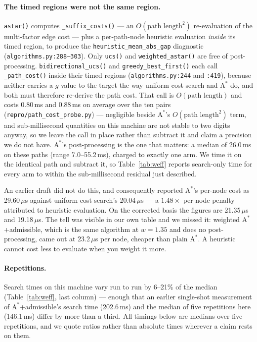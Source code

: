 \documentclass[11pt]{article}
\begin{document}
\paragraph{The timed regions were not the same region.} \texttt{astar()} computes
\texttt{\_suffix\_costs()} --- an $O(\text{path length}^2)$ re-evaluation of the multi-factor edge
cost --- plus a per-path-node heuristic evaluation \emph{inside} its timed region, to produce the
\texttt{heuristic\_mean\_abs\_gap} diagnostic (\texttt{algorithms.py:288--303}).
Only \texttt{ucs()} and \texttt{weighted\_astar()} are free of post-processing.
\texttt{bidirectional\_ucs()} and \texttt{greedy\_best\_first()} each call
\texttt{\_path\_cost()} inside their timed regions (\texttt{algorithms.py:244} and
\texttt{:419}), because neither carries a $g$-value to the target the way uniform-cost search and
$\mathrm{A}^*$ do, and both must therefore re-derive the path cost. That call is
$O(\text{path length})$ and costs 0.80\,ms and 0.88\,ms on average over the ten pairs
(\texttt{repro/\allowbreak path\_cost\_probe.py}) --- negligible beside $\mathrm{A}^*$'s
$O(\text{path length}^2)$ term, and sub-millisecond quantities on this machine are not stable to
two digits anyway, so we leave the call in place rather than subtract it and claim a precision we
do not have. $\mathrm{A}^*$'s post-processing is the one that matters: a median of
26.0\,ms on these paths (range 7.0--55.2\,ms), charged to exactly one arm. We time it on the
identical path and subtract it, so Table~\ref{tab:weff} reports search-only time for every arm to
within the sub-millisecond residual just described.

An earlier draft did not do this, and consequently reported $\mathrm{A}^*$'s per-node cost as
29.60\,$\mu$s against uniform-cost search's 20.04\,$\mu$s --- a $1.48\times$ per-node penalty
attributed to heuristic evaluation. On the corrected basis the figures are 21.35\,$\mu$s and
19.18\,$\mu$s. The tell was visible in our own table and we missed it: weighted
$\mathrm{A}^*$+admissible, which is the same algorithm at $w = 1.35$ and does no post-processing,
came out at 23.2\,$\mu$s per node, cheaper than plain $\mathrm{A}^*$. A heuristic cannot cost less
to evaluate when you weight it more.

\paragraph{Repetitions.} Search times on this machine vary run to run by 6--21\% of the median
(Table~\ref{tab:weff}, last column) --- enough that an earlier single-shot measurement of
$\mathrm{A}^*$+admissible's search time (202.6\,ms) and the median of five repetitions here
(146.1\,ms) differ by more than a third. All timings below are medians over five repetitions, and
we quote ratios rather than absolute times wherever a claim rests on them.
\end{document}
